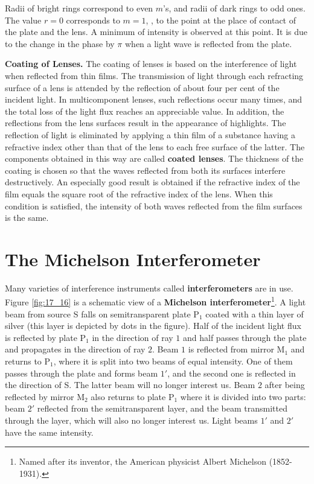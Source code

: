 \noindent
Radii of bright rings correspond to even $m$'s, and radii of dark rings to odd ones.
The value $r=0$ corresponds to $m=1$, \ie, to the point at the place of contact of the plate and the lens.
A minimum of intensity is observed at this point.
It is due to the change in the phase by $\pi$ when a light wave is reflected from the plate.

\textbf{Coating of Lenses.}
The coating of lenses is based on the interference of light when reflected from thin films.
The transmission of light through each refracting surface of a lens is attended by the reflection of about four per cent of the incident light.
In multicomponent lenses, such reflections occur many times, and the total loss of the light flux reaches an appreciable value.
In addition, the reflections from the lens surfaces result in the appearance of highlights.
The reflection of light is eliminated by applying a thin film of a substance having a refractive index other than that of the lens to each free surface of the latter.
The components obtained in this way are called \textbf{coated lenses}.
The thickness of the coating is chosen so that the waves reflected from both its surfaces interfere destructively.
An especially good result is obtained if the refractive index of the film equals the square root of the refractive index of the lens.
When this condition is satisfied, the intensity of both waves reflected from the film surfaces is the same.

\section{The Michelson Interferometer}\label{sec:17_5}

Many varieties of interference instruments called \textbf{interferometers} are in use.
Figure \ref{fig:17_16} is a schematic view of a \textbf{Michelson interferometer}\footnote{Named after its inventor, the American physicist Albert Michelson (1852-1931).}.
A light beam from source S falls on semitransparent plate P$_1$ coated with a thin layer of silver (this layer is depicted by dots in the figure).
Half of the incident light flux is reflected by plate P$_1$ in the direction of ray $1$ and half passes through the plate and propagates in the direction of ray $2$. Beam $1$ is reflected from mirror M$_1$ and returns to P$_1$, where it is split into two beams of equal intensity.
One of them passes through the plate and forms beam $1'$, and the second one is reflected in the direction of S.
The latter beam will no longer interest us.
Beam $2$ after being reflected by mirror M$_2$ also returns to plate P$_1$ where it is divided into two parts: beam $2'$ reflected from the semitransparent layer, and the beam transmitted through the layer, which will also no longer interest us.
Light beams $1'$ and $2'$ have the same intensity.

